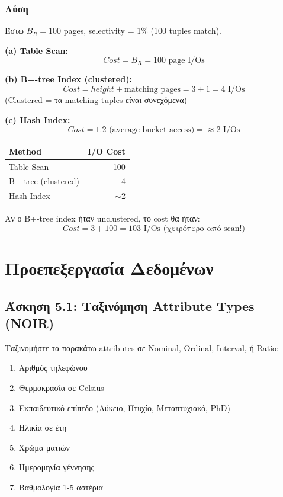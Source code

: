 \subsubsection*{Λύση}

Έστω $B_R = 100$ pages, selectivity = 1\% (100 tuples match).

\textbf{(a) Table Scan:}
$$Cost = B_R = 100 \text{ page I/Os}$$

\textbf{(b) B+-tree Index (clustered):}
$$Cost = height + \text{matching pages} = 3 + 1 = 4 \text{ I/Os}$$
(Clustered = τα matching tuples είναι συνεχόμενα)

\textbf{(c) Hash Index:}
$$Cost = 1.2 \text{ (average bucket access)} = \approx 2 \text{ I/Os}$$

\begin{center}
\begin{tabular}{lr}
\toprule
\textbf{Method} & \textbf{I/O Cost} \\
\midrule
Table Scan & 100 \\
B+-tree (clustered) & 4 \\
Hash Index & $\sim$2 \\
\bottomrule
\end{tabular}
\end{center}

\begin{warningbox}
Αν ο B+-tree index ήταν unclustered, το cost θα ήταν:
$$Cost = 3 + 100 = 103 \text{ I/Os (χειρότερο από scan!)}$$
\end{warningbox}


\section{Προεπεξεργασία Δεδομένων}

\subsection{Άσκηση 5.1: Ταξινόμηση Attribute Types (NOIR)}

\begin{formulabox}[Εκφώνηση]
Ταξινομήστε τα παρακάτω attributes σε Nominal, Ordinal, Interval, ή Ratio:

\begin{enumerate}
    \item Αριθμός τηλεφώνου
    \item Θερμοκρασία σε Celsius
    \item Εκπαιδευτικό επίπεδο (Λύκειο, Πτυχίο, Μεταπτυχιακό, PhD)
    \item Ηλικία σε έτη
    \item Χρώμα ματιών
    \item Ημερομηνία γέννησης
    \item Βαθμολογία 1-5 αστέρια
\end{enumerate}
\end{formulabox}


